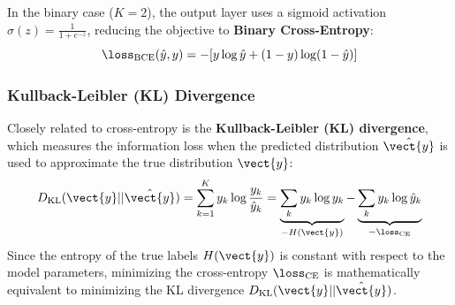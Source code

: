 In the binary case ($K=2$), the output layer uses a sigmoid activation $\sigma(z) = \frac{1}{1+e^{-z}}$, reducing the objective to \textbf{Binary Cross-Entropy}:
\begin{equation}
    \loss_{\text{BCE}}(\hat{y}, y) = -[y \log \hat{y} + (1-y) \log(1-\hat{y})]
\end{equation}

\subsubsection{Kullback-Leibler (KL) Divergence}
Closely related to cross-entropy is the \textbf{Kullback-Leibler (KL) divergence}, which measures the information loss when the predicted distribution $\hat{\vect{y}}$ is used to approximate the true distribution $\vect{y}$:
\begin{equation}
    D_{\text{KL}}(\vect{y} || \hat{\vect{y}}) = \sum_{k=1}^{K} y_k \log \frac{y_k}{\hat{y}_k} = \underbrace{\sum_{k} y_k \log y_k}_{-H(\vect{y})} - \underbrace{\sum_{k} y_k \log \hat{y}_k}_{-\loss_{\text{CE}}}
\end{equation}
Since the entropy of the true labels $H(\vect{y})$ is constant with respect to the model parameters, minimizing the cross-entropy $\loss_{\text{CE}}$ is mathematically equivalent to minimizing the KL divergence $D_{\text{KL}}(\vect{y} || \hat{\vect{y}})$.